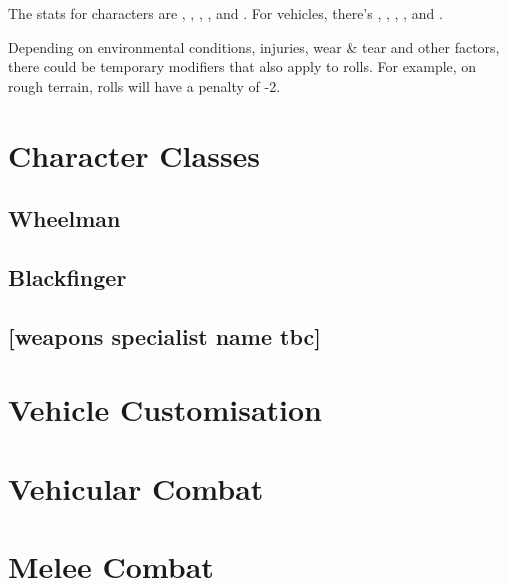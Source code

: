 \documentclass[10pt, a4paper, twocolumn]{book}
\begin{document}
The stats for characters are , , , ,
 and . For vehicles, there's ,
, , ,  and .

Depending on environmental conditions, injuries, wear \&
tear and other factors, there could be temporary modifiers that also apply to
rolls. For example, on rough terrain,  rolls will have a penalty
of -2.

\chapter{Character Classes}
\section{Wheelman}
\section{Blackfinger}
\section{[weapons specialist name tbc]}
\chapter{Vehicle Customisation}
\chapter{Vehicular Combat}

\chapter{Melee Combat}
\end{document}
